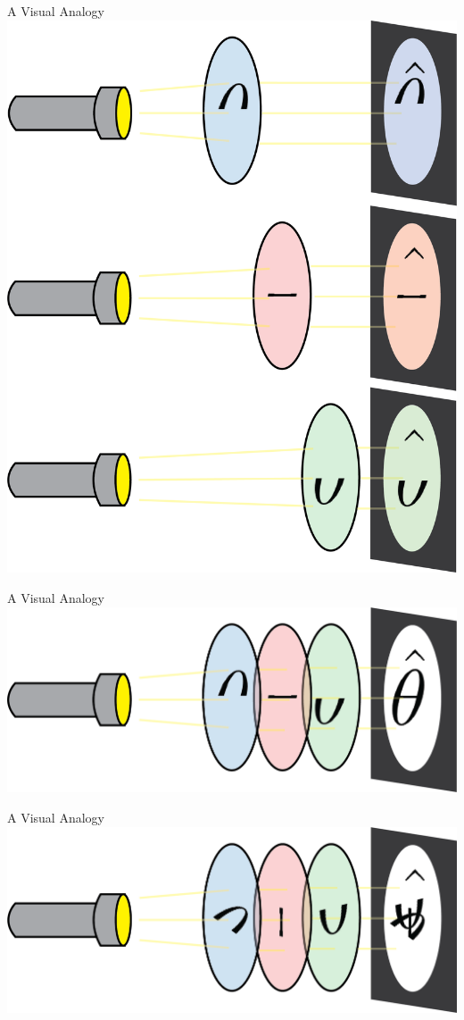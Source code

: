 \documentclass{beamer}
\begin{document}
\begin{frame}{A Visual Analogy}
	\centering		
	\includegraphics[scale=0.35]{images/fusion_piece_flashlight_analogy.png}	
\end{frame}

\begin{frame}{A Visual Analogy}
	\centering		
	\includegraphics[scale=0.55]{images/fusion_analogy1.png}	
\end{frame}

\begin{frame}{A Visual Analogy}
	\centering
	\includegraphics[scale=0.55]{images/fusion_analogy2.png}	
\end{frame}
\end{document}
